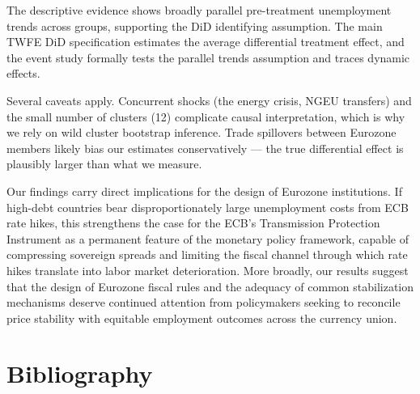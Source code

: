 \documentclass[12pt,a4paper]{article}
\begin{document}
The descriptive evidence shows broadly parallel pre-treatment unemployment trends across groups, supporting the DiD identifying assumption. The main TWFE DiD specification estimates the average differential treatment effect, and the event study formally tests the parallel trends assumption and traces dynamic effects.

Several caveats apply. Concurrent shocks (the energy crisis, NGEU transfers) and the small number of clusters (12) complicate causal interpretation, which is why we rely on wild cluster bootstrap inference. Trade spillovers between Eurozone members likely bias our estimates conservatively --- the true differential effect is plausibly larger than what we measure.

Our findings carry direct implications for the design of Eurozone institutions. If high-debt countries bear disproportionately large unemployment costs from ECB rate hikes, this strengthens the case for the ECB's Transmission Protection Instrument as a permanent feature of the monetary policy framework, capable of compressing sovereign spreads and limiting the fiscal channel through which rate hikes translate into labor market deterioration. More broadly, our results suggest that the design of Eurozone fiscal rules and the adequacy of common stabilization mechanisms deserve continued attention from policymakers seeking to reconcile price stability with equitable employment outcomes across the currency union.

\section*{Bibliography}
\end{document}
